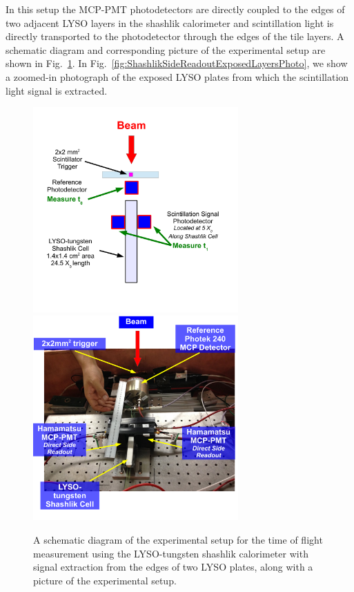 In this setup the MCP-PMT photodetectors are directly coupled to the edges of two adjacent LYSO layers in the shashlik
calorimeter and scintillation light is directly transported to the photodetector
through the edges of the tile layers. A schematic diagram and corresponding
picture  of the experimental setup are shown in
Fig.~\ref{fig:ShashlikSideReadoutSetup}. In
Fig.~\ref{fig:ShashlikSideReadoutExposedLayersPhoto}, we show a zoomed-in
photograph of the exposed LYSO plates from which the scintillation light signal
is extracted.

\begin{figure}[H] \centering
\includegraphics[width=0.7\textwidth]{figs/timing/ShashlikSideReadoutSetupSchematic} \\
\includegraphics[width=0.7\textwidth]{figs/timing/ShashlikSideReadoutPhotoB} 
\caption{A schematic diagram of the experimental setup for the
time of flight measurement using the LYSO-tungsten shashlik calorimeter
with signal extraction from the edges of two LYSO plates, along
with a picture of the experimental setup. } 
\label{fig:ShashlikSideReadoutSetup}
\end{figure}


